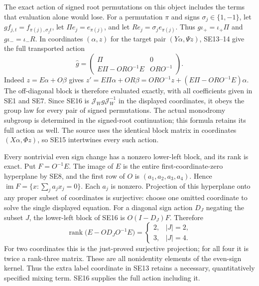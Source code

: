 \documentclass[11pt]{article}
\begin{document}
The exact action of signed root permutations on this object includes
the terms that evaluation alone would lose. For a permutation $\pi$
and signs $\sigma_j\in\{1,-1\}$, let
$g f_{j,t}=f_{\pi(j),\sigma_jt}$, let $\Pi e_j=e_{\pi(j)}$,
and let $R e_j=\sigma_j e_{\pi(j)}$. Thus
$g\iota_+=\iota_+\Pi$ and $g\iota_-=\iota_-R$.
In coordinates $(\alpha,z)$ for the target pair $(Y\alpha,\Psi z)$,
SE13--14 give the full transported action
\[
 \widehat g=
 \begin{pmatrix}
  \Pi&0\\ E\Pi-ORO^{-1}E&ORO^{-1}
 \end{pmatrix}.
 \tag{SE16}
\]
Indeed $z=E\alpha+O\beta$ gives
$z'=E\Pi\alpha+OR\beta
=ORO^{-1}z+(E\Pi-ORO^{-1}E)\alpha$.
The off-diagonal block is therefore evaluated exactly, with all
coefficients given in SE1 and SE7. Since SE16 is
$\mathcal J_W g\mathcal J_W^{-1}$ in the displayed coordinates,
it obeys the group law for every pair of signed permutations.
The actual monodromy subgroup is determined in the signed-root
continuation; this formula retains its full action as well.
The source uses the identical block matrix in coordinates
$(X\alpha,\Phi z)$, so SE15 intertwines every such action.

Every nontrivial even sign change has a nonzero lower-left block,
and its rank is exact. Put $F=O^{-1}E$. The image of $E$ is the
entire first-coordinate-zero hyperplane by SE8, and the first row
of $O$ is $(a_1,a_2,a_3,a_4)$. Hence
$\operatorname{im}F=\{x:\sum_j a_jx_j=0\}$.
Each $a_j$ is nonzero. Projection of this hyperplane onto any
proper subset of coordinates is surjective: choose one omitted
coordinate to solve the single displayed equation. For a diagonal
sign action $D_J$ negating the subset $J$, the lower-left block
of SE16 is $O(I-D_J)F$. Therefore
\[
 \operatorname{rank}\bigl(E-OD_JO^{-1}E\bigr)
 =\begin{cases}2,&|J|=2,\\3,&|J|=4.\end{cases}
 \tag{SE18}
\]
For two coordinates this is the just-proved surjective projection;
for all four it is twice a rank-three matrix. These are all
nonidentity elements of the even-sign kernel. Thus the extra
label coordinate in SE13 retains a necessary, quantitatively
specified mixing term. SE16 supplies the full action including it.
\end{document}
